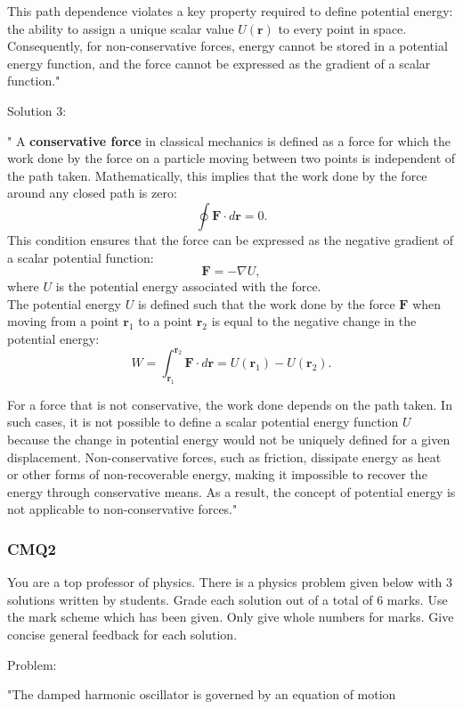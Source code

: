 This path dependence violates a key property required to define potential energy: the ability to assign a unique scalar value $U(\mathbf{r})$ to every point in space. Consequently, for non-conservative forces, energy cannot be stored in a potential energy function, and the force cannot be expressed as the gradient of a scalar function."

Solution 3:

"
A \textbf{conservative force} in classical mechanics is defined as a force for which the work done by the force on a particle moving between two points is independent of the path taken. Mathematically, this implies that the work done by the force around any closed path is zero:
\[
\oint \mathbf{F} \cdot d\mathbf{r} = 0.
\]
This condition ensures that the force can be expressed as the negative gradient of a scalar potential function:
\[
\mathbf{F} = -\nabla U,
\]
where $U$ is the potential energy associated with the force. \\

The potential energy $U$ is defined such that the work done by the force $\mathbf{F}$ when moving from a point $\mathbf{r}_1$ to a point $\mathbf{r}_2$ is equal to the negative change in the potential energy:
\[
W = \int_{\mathbf{r}_1}^{\mathbf{r}_2} \mathbf{F} \cdot d\mathbf{r} = U(\mathbf{r}_1) - U(\mathbf{r}_2).
\]

For a force that is not conservative, the work done depends on the path taken. In such cases, it is not possible to define a scalar potential energy function $U$ because the change in potential energy would not be uniquely defined for a given displacement. Non-conservative forces, such as friction, dissipate energy as heat or other forms of non-recoverable energy, making it impossible to recover the energy through conservative means. As a result, the concept of potential energy is not applicable to non-conservative forces."

\subsubsection{CMQ2}

You are a top professor of physics. There is a physics problem given below with 3 solutions written by students. Grade each solution out of a total of 6 marks. Use the mark scheme which has been given. Only give whole numbers for marks. Give concise general feedback for each solution.

Problem: 

"The damped harmonic oscillator is governed by an equation of motion


